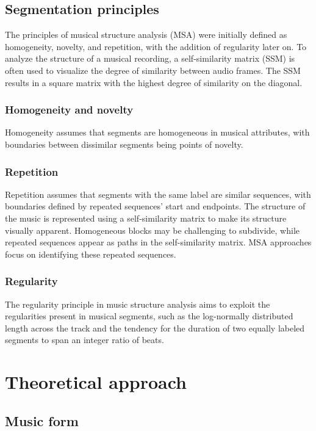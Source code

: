 \subsection{Segmentation principles}
The principles of musical structure analysis (MSA) were initially defined as homogeneity, novelty, and repetition, with the addition of regularity later on. To analyze the structure of a musical recording, a self-similarity matrix (SSM) is often used to visualize the degree of similarity between audio frames. The SSM results in a square matrix with the highest degree of similarity on the diagonal.

\subsubsection{Homogeneity and novelty}
Homogeneity assumes that segments are homogeneous in musical attributes, with boundaries between dissimilar segments being points of novelty. 

\subsubsection{Repetition}
Repetition assumes that segments with the same label are similar sequences, with boundaries defined by repeated sequences' start and endpoints. The structure of the music is represented using a self-similarity matrix to make its structure visually apparent. Homogeneous blocks may be challenging to subdivide, while repeated sequences appear as paths in the self-similarity matrix. MSA approaches focus on identifying these repeated sequences.

\subsubsection{Regularity}
The regularity principle in music structure analysis aims to exploit the regularities present in musical segments, such as the log-normally distributed length across the track and the tendency for the duration of two equally labeled segments to span an integer ratio of beats.

\section{Theoretical approach}
\subsection{Music form}

